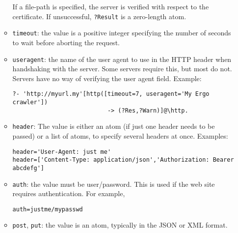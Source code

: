 \begin{itemize}
\begin{itemize}
    If a file-path is specified, the server is verified with respect to the
    certificate. If unsuccessful, \texttt{?Result} is a zero-length atom.
  \item \texttt{timeout}: the value is a positive integer specifying the
    number of seconds to wait before aborting the request.
  \item \texttt{useragent}: the name of the user agent to use in the HTTP header
    when handshaking with the server. Some servers require this, but most
    do not. Servers have no way of verifying the user agent field.
    Example:
\begin{verbatim}
?- 'http://myurl.my'[http([timeout=7, useragent='My Ergo crawler'])
                           -> (?Res,?Warn)]@\http.
\end{verbatim}
  \item \texttt{header}: The
    value is either an atom (if just one header needs to be passed) or a
    list of atoms, to specify several headers at once. Examples:
\begin{verbatim}
header='User-Agent: just me'
header=['Content-Type: application/json','Authorization: Bearer abcdefg']
\end{verbatim}
    \item \texttt{auth}: the value must be user/password. This is used if
      the web site requires authentication. For example,
\begin{verbatim}
auth=justme/mypasswd      
\end{verbatim}
    \item \texttt{post}, \texttt{put}: the value is an atom, typically in
      the JSON or XML format.
      

\end{itemize}
\end{itemize}
